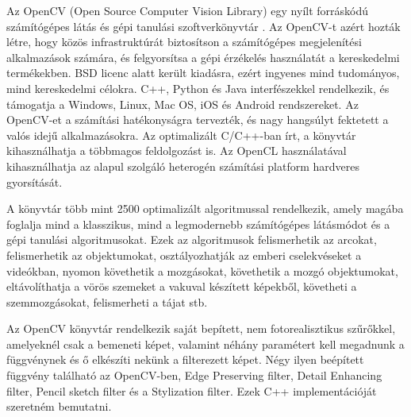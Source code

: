 
\label{chap:implement}


Az OpenCV (Open Source Computer Vision Library) egy nyílt forráskódú számítógépes látás és gépi tanulási szoftverkönyvtár \cite{opencv}. Az OpenCV-t azért hozták létre, hogy közös infrastruktúrát biztosítson a számítógépes megjelenítési alkalmazások számára, és felgyorsítsa a gépi érzékelés használatát a kereskedelmi termékekben. BSD licenc alatt került kiadásra, ezért ingyenes mind tudományos, mind kereskedelmi célokra. C++, Python és Java interfészekkel rendelkezik, és támogatja a Windows, Linux, Mac OS, iOS és Android rendszereket. Az OpenCV-et a számítási hatékonyságra tervezték, és nagy hangsúlyt fektetett a valós idejű alkalmazásokra. Az optimalizált C/C++-ban írt, a könyvtár kihasználhatja a többmagos feldolgozást is. Az OpenCL használatával kihasználhatja az alapul szolgáló heterogén számítási platform hardveres gyorsítását.

A könyvtár több mint 2500 optimalizált algoritmussal rendelkezik, amely magába foglalja mind a klasszikus, mind a legmodernebb számítógépes látásmódot és a gépi tanulási algoritmusokat. Ezek az algoritmusok felismerhetik az arcokat, felismerhetik az objektumokat, osztályozhatják az emberi cselekvéseket a videókban, nyomon követhetik a mozgásokat, követhetik a mozgó objektumokat, eltávolíthatja a vörös szemeket a vakuval készített képekből, követheti a szemmozgásokat, felismerheti a tájat stb. 



Az OpenCV könyvtár rendelkezik saját bepített, nem fotorealisztikus szűrőkkel, amelyeknél csak a bemeneti képet, valamint néhány paramétert kell megadnunk a függvénynek és ő elkészíti nekünk a filterezett képet. Négy ilyen beépített függvény található az OpenCV-ben, Edge Preserving filter, Detail Enhancing filter, Pencil sketch filter és a Stylization filter. Ezek C++ implementációját szeretném bemutatni.


